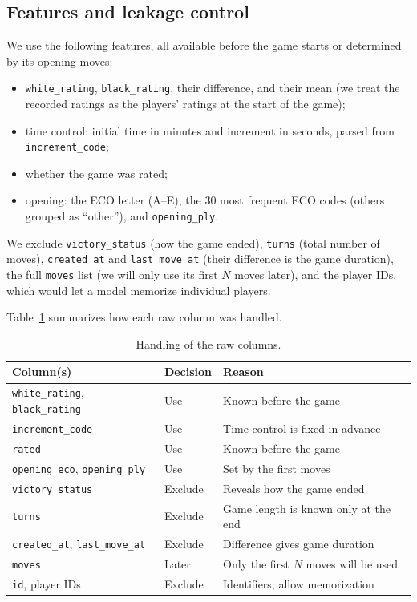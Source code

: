 \documentclass[sigconf]{acmart}
\begin{document}
\subsection{Features and leakage control}\label{sec:features}
We use the following features, all available before the game starts or determined by its opening moves:
\begin{itemize}
  \item \texttt{white\_rating}, \texttt{black\_rating}, their difference, and their mean (we treat the recorded ratings as the players' ratings at the start of the game);
  \item time control: initial time in minutes and increment in seconds, parsed from \texttt{increment\_code};
  \item whether the game was rated;
  \item opening: the ECO letter (A--E), the 30 most frequent ECO codes (others grouped as ``other''), and \texttt{opening\_ply}.
\end{itemize}
We exclude \texttt{victory\_status} (how the game ended), \texttt{turns} (total number of moves), \texttt{created\_at} and \texttt{last\_move\_at} (their difference is the game duration), the full \texttt{moves} list (we will only use its first $N$ moves later), and the player IDs, which would let a model memorize individual players.

Table~\ref{tab:cols} summarizes how each raw column was handled.

\begin{table}[h]
  \caption{Handling of the raw columns.}
  \label{tab:cols}
  \footnotesize
  \begin{tabular}{@{}p{1.15in}p{0.6in}p{1.25in}@{}}
    \toprule
    Column(s) & Decision & Reason \\
    \midrule
    \texttt{white\_rating}, \texttt{black\_rating} & Use & Known before the game \\
    \texttt{increment\_code} & Use & Time control is fixed in advance \\
    \texttt{rated} & Use & Known before the game \\
    \texttt{opening\_eco}, \texttt{opening\_ply} & Use & Set by the first moves \\
    \texttt{victory\_status} & Exclude & Reveals how the game ended \\
    \texttt{turns} & Exclude & Game length is known only at the end \\
    \texttt{created\_at}, \texttt{last\_move\_at} & Exclude & Difference gives game duration \\
    \texttt{moves} & Later & Only the first $N$ moves will be used \\
    \texttt{id}, player IDs & Exclude & Identifiers; allow memorization \\
    \bottomrule
  \end{tabular}
\end{table}
\end{document}
